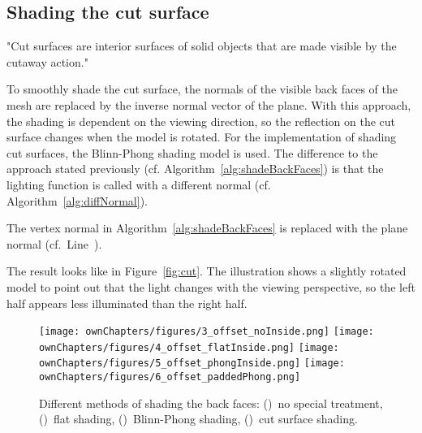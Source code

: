 \subsection{Shading the cut surface}
\label{chap:cutSurface}
"Cut surfaces are interior surfaces of solid objects that are made visible by the cutaway action."~\cite{jour:adaptiveCutaways}

To smoothly shade the cut surface, the normals of the visible back faces of the mesh are replaced by the inverse normal vector of the plane. With this approach, the shading is dependent on the viewing direction, so the reflection on the cut surface changes when the model is rotated. For the implementation of shading cut surfaces, the Blinn-Phong shading model is used. The difference to the approach stated previously (cf. Algorithm~\ref{alg:shadeBackFaces}) is that the lighting function is called with a different normal (cf. Algorithm~\ref{alg:diffNormal}).
\begin{algorithm}
\;
\BlankLine
\caption{The vertex normal in Algorithm~\ref{alg:shadeBackFaces} is replaced with the plane normal (cf.~Line~\NlSty{\ref{ln:normVN}}).}
\label{alg:diffNormal}
\end{algorithm}

The result looks like in Figure~\ref{fig:cut}. The illustration shows a slightly rotated model to point out that the light changes with the viewing perspective, so the left half appears less illuminated than the right half.
\begin{figure}%
\centering
{}
	{\texttt{[image: ownChapters/figures/3\_offset\_noInside.png]}}
\hspace{7.00mm}
	{\texttt{[image: ownChapters/figures/4\_offset\_flatInside.png]}}
\hspace{7.00mm}
	{\texttt{[image: ownChapters/figures/5\_offset\_phongInside.png]}}
\hspace{7.00mm}
	{\texttt{[image: ownChapters/figures/6\_offset\_paddedPhong.png]}}
\caption{Different methods of shading the back faces: ()~no special treatment, ()~flat shading, ()~Blinn-Phong shading, ()~cut surface shading.}%
\label{fig:shading}%
\end{figure}
%